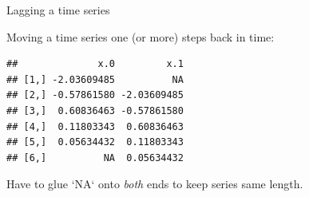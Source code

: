 \begin{frame}[fragile]{Lagging a time series}

Moving a time series one (or more) steps back in time:

\begin{knitrout}
\color{fgcolor}\begin{kframe}
\begin{alltt}
\hlkwb{=}\hlstd{(}\hlstd{)}
\hlkwb{=}\hlstd{(}
\hlkwb{=}\hlstd{)}
\end{alltt}
\begin{verbatim}
##              x.0         x.1
## [1,] -2.03609485          NA
## [2,] -0.57861580 -2.03609485
## [3,]  0.60836463 -0.57861580
## [4,]  0.11803343  0.60836463
## [5,]  0.05634432  0.11803343
## [6,]          NA  0.05634432
\end{verbatim}
\end{kframe}
\end{knitrout}

Have to glue `NA` onto \emph{both} ends to keep series same length.

\end{frame}

